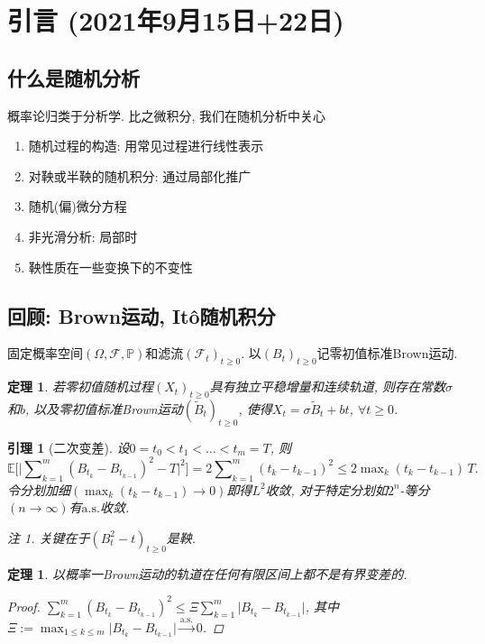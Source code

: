 \documentclass{ctexart}
\theoremstyle{definition}
\theoremstyle{remark}
\newtheorem{Rmk}[Def]{注}
\theoremstyle{plain}
\newtheorem{Lem}[Def]{引理}
\newtheorem{Thm}[Def]{定理}
\newcommand{\1}{\mathbbm{1}}				%
\newcommand{\as}{\mathrm{a.s.}}				%
\renewcommand{\P}{\mathbb{P}}				%
\newcommand{\E}{\mathbb{E}}					%
\newcommand{\abs}[1]{\lvert#1\rvert}			%
\newcommand{\tsum}{\textstyle\sum\nolimits}
\begin{document}
\clearpage

\tableofcontents

\vspace{-2.333ex}


\clearpage
{}
\setcounter{page}{1}


\addtocounter{section}{-1}
\section{引言 \normalfont\footnotesize (2021年9月15日+22日)}
\subsection*{什么是随机分析}
概率论归类于分析学. 比之微积分, 我们在随机分析中关心
\begin{enumerate}
	\item 随机过程的构造: 用常见过程进行线性表示
	\item 对鞅或半鞅的随机积分: 通过局部化推广
	\item 随机(偏)微分方程
	\item 非光滑分析: 局部时
	\item 鞅性质在一些变换下的不变性
\end{enumerate}

\subsection*{回顾: Brown运动, It\^{o}随机积分}
固定概率空间$(\Omega,\mathscr{F},\P)$和滤流$(\mathscr{F}_{t})_{t \ge 0}$. 以$(B_{t})_{t \ge 0}$记零初值标准Brown运动.
\begin{Thm}
若零初值随机过程$(X_{t})_{t \ge 0}$具有独立平稳增量和连续轨道, 则存在常数$\sigma$和$b$, 以及零初值标准Brown运动$(\tilde{B}_{t})_{t \ge 0}$, 使得$X_{t} = \sigma\tilde{B}_{t} + b t$, $\forall t \ge 0$.
\end{Thm}

\begin{Lem}[二次变差]
设$0 = t_{0} < t_{1} < \dots < t_{m} = T$, 则
\[ \E\big[\abs{ \tsum_{k=1}^{m}(B_{t_{k}}-B_{t_{k-1}})^{2} - T }^{2}\big] = 2 \tsum_{k=1}^{m}(t_{k}-t_{k-1})^{2} \le 2 \max\nolimits_{k}(t_{k}-t_{k-1}) \, T . \]
令分划加细$(\max_{k}(t_{k}-t_{k-1}) \to 0)$即得$L^2$收敛, 对于特定分划如$2^n$-等分$(n\to\infty)$有$\as$收敛.
\begin{Rmk}
关键在于$(B_{t}^{2}-t)_{t \ge 0}$是鞅.
\end{Rmk}
\end{Lem}
\begin{Thm}
以概率一Brown运动的轨道在任何有限区间上都不是有界变差的.
\begin{proof}
$\tsum_{k=1}^{m}(B_{t_{k}}-B_{t_{k-1}})^{2} \le \Xi \tsum_{k=1}^{m}\abs{B_{t_{k}}-B_{t_{k-1}}}$, 其中$\Xi := \max_{1 \le k \le m} \abs{B_{t_{k}}-B_{t_{k-1}}} \xrightarrow{\as} 0$.
\end{proof}
\end{Thm}
\end{document}
